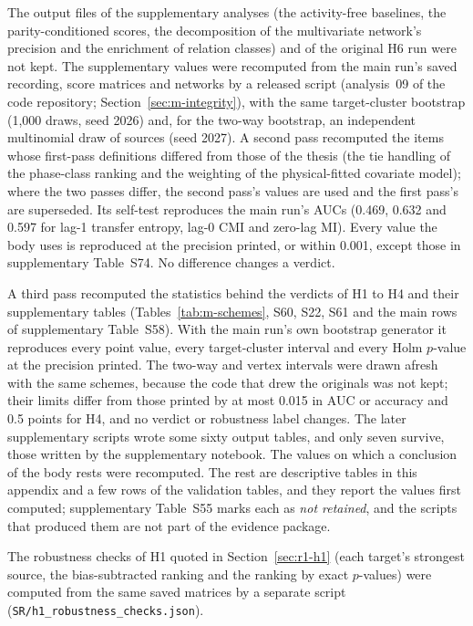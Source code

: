 The output files of the supplementary analyses (the activity-free baselines, the parity-conditioned scores, the decomposition of the multivariate network's precision and the enrichment of relation classes) and of the original H6 run were not kept. The supplementary values were recomputed from the main run's saved recording, score matrices and networks by a released script (analysis~09 of the code repository; Section~\ref{sec:m-integrity}), with the same target-cluster bootstrap (1,000 draws, seed 2026) and, for the two-way bootstrap, an independent multinomial draw of sources (seed 2027). A second pass recomputed the items whose first-pass definitions differed from those of the thesis (the tie handling of the phase-class ranking and the weighting of the physical-fitted covariate model); where the two passes differ, the second pass's values are used and the first pass's are superseded. Its self-test reproduces the main run's AUCs (0.469, 0.632 and 0.597 for lag-1 transfer entropy, lag-0 CMI and zero-lag MI). Every value the body uses is reproduced at the precision printed, or within 0.001, except those in supplementary Table~S74. No difference changes a verdict.

A third pass recomputed the statistics behind the verdicts of H1 to H4 and their supplementary tables (Tables~\ref{tab:m-schemes}, S60, S22, S61 and the main rows of supplementary Table~S58). With the main run's own bootstrap generator it reproduces every point value, every target-cluster interval and every Holm $p$-value at the precision printed. The two-way and vertex intervals were drawn afresh with the same schemes, because the code that drew the originals was not kept; their limits differ from those printed by at most 0.015 in AUC or accuracy and 0.5 points for H4, and no verdict or robustness label changes.
The later supplementary scripts wrote some sixty output tables, and only seven survive, those written by the supplementary notebook. The values on which a conclusion of the body rests were recomputed. The rest are descriptive tables in this appendix and a few rows of the validation tables, and they report the values first computed; supplementary Table~S55 marks each as \emph{not retained}, and the scripts that produced them are not part of the evidence package.

The robustness checks of H1 quoted in Section~\ref{sec:r1-h1} (each target's strongest source, the bias-subtracted ranking and the ranking by exact $p$-values) were computed from the same saved matrices by a separate script (\texttt{SR/h1\_robustness\_checks.json}).


